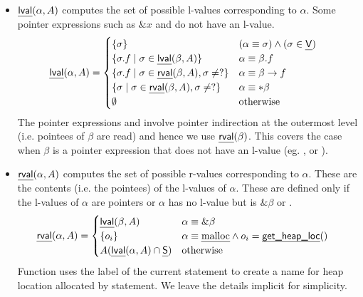 \documentclass[a4paper,11pt,fleqn]{article}
\newcommand{\var}{\text{\sf\em V\/}\xspace}
\begin{document}
\begin{itemize}
\item {$\text{\sf\em lval\/}(\alpha,A)$} computes the set of possible l-values         
      corresponding to $\alpha$. 
Some pointer expressions such as $\&x$    
      and  do not have an l-value. 
\begin{align}
\lval(\alpha,A) & =  
		\begin{cases}
		\{ \sigma \} 	
				& (\alpha \equiv \sigma) \wedge (\sigma \in \var)
			\\
		\{ \sigma.f \mid \sigma \in \lval(\beta,A) \} 
				& \alpha \equiv \beta.f
			\\
		\left\{ \sigma.f \mid \sigma \in \rval(\beta,A), \sigma \neq ? \right\}
				& \alpha \equiv \beta\rightarrow f
			\\
		\left\{ \sigma \mid \sigma \in \rval(\beta,A), \sigma \neq ? \right\}
				& \alpha \equiv *\beta
			\\
		\emptyset	& \text{otherwise}
		\end{cases}
		\label{eq:lval.heap}
\end{align}
The pointer expressions  and 
\text{$*\beta$} involve pointer indirection at the outermost level (i.e. pointees of
$\beta$ are read) and hence we use $\text{\sf\em rval\/}(\beta)$. This 
covers the case when $\beta$ is a pointer expression that does not have an l-value (eg.
, or ).

\item {$\text{\sf\em rval\/}(\alpha,A)$} computes the set of possible r-values
      corresponding to $\alpha$. These are the contents (i.e. the pointees) of the l-values
      of $\alpha$. These are defined only if the l-values of $\alpha$ are pointers
      or $\alpha$ has no l-value but is $\&\beta$ or .
\begin{align}
\text{\sf\em rval\/}(\alpha, A) & = 
		\begin{cases}
		\text{\sf\em lval\/}(\beta,A)
			& \alpha \equiv \&\beta
			\\
		\{ o_i \}	
			& \alpha \equiv \text{\em malloc} \wedge o_i = \text{{\sf\em get\_heap\_loc}}()
			\\
		A(\text{\sf\em lval\/}(\alpha,A) \cap \text{\sf\em S\/}) 
			& \text{otherwise}
		\end{cases}
		\label{eq:rval.heap}
\end{align}
Function \text{$\allocsite()$} uses the label of the current statement to create a name 
for heap location allocated by statement. 
We leave the details implicit for simplicity.


\end{itemize}
\end{document}
